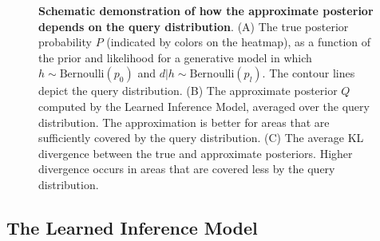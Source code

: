 \begin{figure}
\centering
    \hfill
  \caption{\textbf{Schematic demonstration of how the approximate posterior depends on the query distribution}. (A) The true posterior probability $P$ (indicated by colors on the heatmap), as a function of the prior and likelihood for a generative model in which $h \sim \text{Bernoulli}(p_0)$ and $d|h \sim \text{Bernoulli}(p_l)$. The contour lines depict the query distribution. (B) The approximate posterior $Q$ computed by the Learned Inference Model, averaged over the query distribution. The approximation is better for areas that are sufficiently covered by the query distribution. (C) The average KL divergence between the true and approximate posteriors. Higher divergence occurs in areas that are covered less by the query distribution.
} 
  \label{fig:query_schematic}
\end{figure}

\subsection{The Learned Inference Model}

